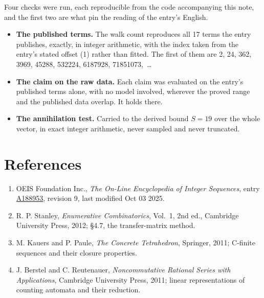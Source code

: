 \documentclass[11pt]{article}
\theoremstyle{definition}
\begin{document}
Four checks were run, each reproducible from the code accompanying this note, and the first two are what pin the reading of the entry's English.

\begin{itemize}

\item {\bfseries The published terms.} The walk count reproduces all 17 terms the entry publishes, exactly, in integer arithmetic, with the index taken from the entry's stated offset (1) rather than fitted. The first of them are 2, 24, 362, 3969, 45288, 532224, 6187928, 71851073,~\dots

\item {\bfseries The claim on the raw data.} Each claim was evaluated on the entry's published terms alone, with no model involved, wherever the proved range and the published data overlap. It holds there.

\item {\bfseries The annihilation test.} Carried to the derived bound $S = 19$ over the whole vector, in exact integer arithmetic, never sampled and never truncated.

\end{itemize}

\section{References}

\begin{enumerate}

\item OEIS Foundation Inc., \emph{The On-Line Encyclopedia of Integer Sequences}, entry \href{https://oeis.org/A188953}{A188953}, revision 9, last modified Oct 03 2025.

\item R. P. Stanley, \emph{Enumerative Combinatorics}, Vol.~1, 2nd ed., Cambridge University Press, 2012; \S4.7, the transfer-matrix method.

\item M. Kauers and P. Paule, \emph{The Concrete Tetrahedron}, Springer, 2011; C-finite sequences and their closure properties.

\item J. Berstel and C. Reutenauer, \emph{Noncommutative Rational Series with Applications}, Cambridge University Press, 2011; linear representations of counting automata and their reduction.

\end{enumerate}
\end{document}

